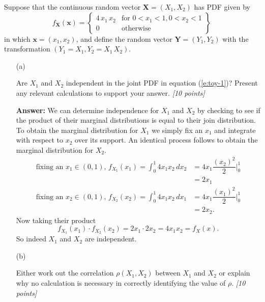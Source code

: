 \documentclass[12pt]{article}
\begin{document}
Suppose that the continuous random vector $\bm{ X } = ( X_1, X_2 )$ has PDF given by
\begin{equation} \label{e:toy-1}
f_{ \bm{ X } } ( \bm{ x } ) = \left\{ \begin{array}{cc} 4 \, x_1 \, x_2 & \text{for } 0 < x_1 < 1, 0 < x_2 < 1 \\ 0 & \text{otherwise} \end{array} \right\} \,
\end{equation}
in which $\bm{ x } = ( x_1, x_2 )$, and define the random vector $\bm{ Y } = ( Y_1, Y_2 )$ with the transformation $( Y_1 = X_1, Y_2 = X_1 \, X_2 )$.

\begin{itemize}

\item[(a)]%

Are $X_1$ and $X_2$ independent in the joint PDF in equation (\ref{e:toy-1})? Present any relevant calculations to support your answer. \textit{[10 points]}

\textbf{Answer:} We can determine independence for $X_1$ and $X_2$ by checking to see if the product of their marginal distributions is equal to their join distribution. To obtain the marginal distribution for $X_1$ we simply fix an $x_1$ and integrate with respect to $x_2$ over its support. An identical process follows to obtain the marginal distribution for $X_2$.
\begin{align*}
    \text{fixing an $x_1 \in (0,1)$, } f_{X_1}(x_1) = \int_{0}^{1}4x_1x_2  \,dx_2  &= 4x_1 \dfrac{(x_2)^2}{2}\Big|_0^1 \\
    &= 2x_1 \\
    \text{fixing an $x_2\in (0,1)$, } f_{X_2}(x_2)  = \int_{0}^{1}4x_1x_2  \,dx_1 &= 4x_1 \dfrac{(x_1)^2}{2}\Big|_0^1 \\
    &= 2x_2. 
\end{align*}
Now taking their product \[f_{X_1}(x_1)\cdot f_{X_2}(x_2) = 2x_1 \cdot 2x_2 = 4x_1x_2 = f_X(x).\] 
So indeed $X_1$ and $X_2$ are independent.

\item[(b)]%

Either work out the correlation $\rho ( X_1, X_2 )$ between $X_1$ and $X_2$ or explain why no calculation is necessary in correctly identifying the value of $\rho$. \textit{[10 points]}


\end{itemize}
\end{document}
